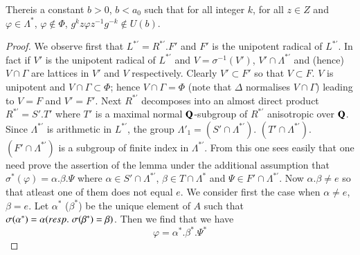 \begin{lemma}\label{art9-lem2.35}
There\pageoriginale is a constant $b > 0$, $b < a_0$ such that for all integer $k$, for all $z \in Z$ and $\varphi \in \Lambda^\ast$, $\varphi \not\in \Phi$, $g^k z \varphi z^{-1} g^{-k} \not\in U (b)$.
\end{lemma}

\begin{proof}
We observe first that $L^{\ast'} = R^{\ast'}. F'$ and $F'$ is the unipotent radical of $L^{\ast'}$. In fact if $V'$ is the unipotent radical of $L^{\ast'}$ and $V = \sigma^{-1} (V')$, $V' \cap \Lambda^{\ast'}$ and (hence) $V \cap \Gamma$ are lattices in $V'$ and $V$ respectively. Clearly $V' \subset F'$ so that $V \subset F$. $V$ is unipotent and $V \cap \Gamma \subset \Phi$; hence $V \cap \Gamma = \Phi$ (note that $\Delta$ normalises $V \cap \Gamma$) leading to $V = F$ and $V' = F'$. Next $R^{\ast'}$ decomposes into an almost direct product $R^{\ast'} = S'. T'$ where $T'$ is a maximal normal $\mathbf{Q}$-subgroup of $R^{\ast'}$ anisotropic over $\mathbf{Q}$. Since $\Lambda^{\ast'}$ is arithmetic in $L^{\ast'}$, the group $\Lambda'_1 = (S' \cap \Lambda^{\ast'})$. $(T' \cap \Lambda^{\ast'})$. $(F' \cap \Lambda^{\ast'})$ is a subgroup of finite index in $\Lambda^{\ast'}$. From this one sees easily that one need prove the assertion of the lemma under the additional assumption that $\sigma^\ast(\varphi) = \alpha. \beta. \Psi$ where $\alpha \in S' \cap \Lambda^{\ast'}$, $\beta \in T \cap \Lambda^\ast$ and $\Psi \in F' \cap \Lambda^{\ast'}$. Now $\alpha. \beta \neq e$ so that atleast one of them does not equal $e$. We consider first the case when $\alpha \neq e$, $\beta = e$. Let $\alpha^\ast$ (\resp $\beta^\ast$) be the unique element of $A$ such that $\sigma (\alpha^\ast) = \alpha ({resp.}\kern.3em \sigma (\beta^\ast) = \beta)$. Then we find that we have
$$
\varphi = \alpha^\ast . \beta^\ast. \Psi^\ast
$$

\end{proof}
